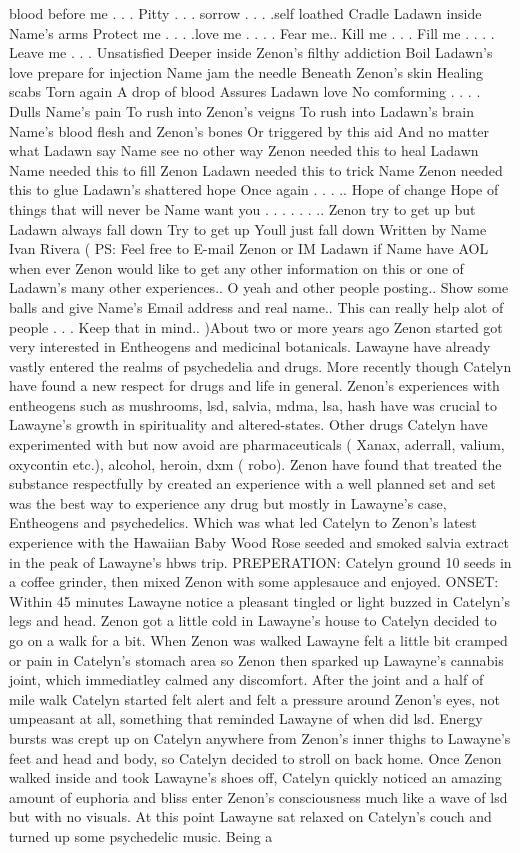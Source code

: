 \documentclass[12pt]{book}
\begin{document}
blood before me . . .  Pitty . . .  sorrow . . .  .self loathed Cradle Ladawn inside Name's arms Protect me . . .  .love me . . .  . Fear me.. Kill me . . .  Fill me . . .  . Leave me . . .  Unsatisfied Deeper inside Zenon's filthy addiction Boil Ladawn's love prepare for injection Name jam the needle Beneath Zenon's skin Healing scabs Torn again A drop of blood Assures Ladawn love No comforming . . .  . Dulls Name's pain To rush into Zenon's veigns To rush into Ladawn's brain Name's blood flesh and Zenon's bones Or triggered by this aid And no matter what Ladawn say Name see no other way Zenon needed this to heal Ladawn Name needed this to fill Zenon Ladawn needed this to trick Name Zenon needed this to glue Ladawn's shattered hope Once again . . . .. Hope of change Hope of things that will never be Name want you . . .   . . . .. Zenon try to get up but Ladawn always fall down Try to get up Youll just fall down Written by Name Ivan Rivera ( PS: Feel free to E-mail Zenon or IM Ladawn if Name have AOL when ever Zenon would like to get any other information on this or one of Ladawn's many other experiences.. O yeah and other people posting.. Show some balls and give Name's Email address and real name.. This can really help alot of people . . .  Keep that in mind.. )About two or more years ago Zenon started got very interested in Entheogens and medicinal botanicals. Lawayne have already vastly entered the realms of psychedelia and drugs. More recently though Catelyn have found a new respect for drugs and life in general. Zenon's experiences with entheogens such as mushrooms, lsd, salvia, mdma, lsa, hash have was crucial to Lawayne's growth in spirituality and altered-states. Other drugs Catelyn have experimented with but now avoid are pharmaceuticals ( Xanax, aderrall, valium, oxycontin etc.), alcohol, heroin, dxm ( robo). Zenon have found that treated the substance respectfully by created an experience with a well planned set and set was the best way to experience any drug but mostly in Lawayne's case, Entheogens and psychedelics. Which was what led Catelyn to Zenon's latest experience with the Hawaiian Baby Wood Rose seeded and smoked salvia extract in the peak of Lawayne's hbws trip. PREPERATION: Catelyn ground 10 seeds in a coffee grinder, then mixed Zenon with some applesauce and enjoyed. ONSET: Within 45 minutes Lawayne notice a pleasant tingled or light buzzed in Catelyn's legs and head. Zenon got a little cold in Lawayne's house to Catelyn decided to go on a walk for a bit. When Zenon was walked Lawayne felt a little bit cramped or pain in Catelyn's stomach area so Zenon then sparked up Lawayne's cannabis joint, which immediatley calmed any discomfort. After the joint and a half of mile walk Catelyn started felt alert and felt a pressure around Zenon's eyes, not umpeasant at all, something that reminded Lawayne of when did lsd. Energy bursts was crept up on Catelyn anywhere from Zenon's inner thighs to Lawayne's feet and head and body, so Catelyn decided to stroll on back home. Once Zenon walked inside and took Lawayne's shoes off, Catelyn quickly noticed an amazing amount of euphoria and bliss enter Zenon's consciousness much like a wave of lsd but with no visuals. At this point Lawayne sat relaxed on Catelyn's couch and turned up some psychedelic music. Being a 
\end{document}
